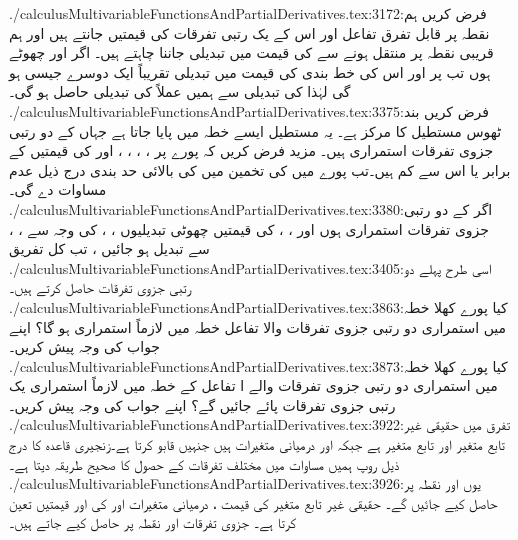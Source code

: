 ./calculusMultivariableFunctionsAndPartialDerivatives.tex:3172:فرض  کریں ہم   نقطہ    پر قابل تفرق تفاعل   اور اس کے یک رتبی تفرقات  کی قیمتیں جانتے ہیں اور ہم قریبی نقطہ   پر   منتقل ہونے سے  کی قیمت میں تبدیلی  جاننا چاہتے  ہیں۔ اگر  اور  چھوٹے ہوں تب پر   اور اس کی خط بندی کی  قیمت  میں تبدیلی تقریباً ایک دوسرے جیسی ہو گی لہٰذا  کی تبدیلی سے ہمیں عملاً   کی تبدیلی حاصل ہو گی۔
./calculusMultivariableFunctionsAndPartialDerivatives.tex:3375:فرض کریں بند  ٹھوس مستطیل   کا مرکز  ہے۔ یہ مستطیل ایسے خطہ میں پایا جاتا ہے جہاں  کے دو رتبی جزوی تفرقات استمراری ہیں۔ مزید فرض کریں کہ پورے  پر ،  ،  ،  ،   اور   کی قیمتیں  کے برابر یا اس سے کم ہیں۔تب پورے  میں    کی تخمین  میں  کی بالائی حد بندی   درج ذیل عدم مساوات دے گی۔
./calculusMultivariableFunctionsAndPartialDerivatives.tex:3380:اگر  کے  دو رتبی جزوی تفرقات استمراری ہوں اور ، ،  کی قیمتیں  چھوٹی تبدیلیوں ، ،  کی وجہ سے  ، ،  سے تبدیل ہو جائیں ، تب کل  تفریق
./calculusMultivariableFunctionsAndPartialDerivatives.tex:3405:اسی طرح پہلے دو رتبی جزوی تفرقات حاصل کرتے ہیں۔
./calculusMultivariableFunctionsAndPartialDerivatives.tex:3863:کیا پورے  کھلا خطہ  میں استمراری دو رتبی جزوی تفرقات والا   تفاعل  خطہ  میں لازماً استمراری ہو گا؟ اپنے جواب کی وجہ پیش کریں۔
./calculusMultivariableFunctionsAndPartialDerivatives.tex:3873:کیا پورے کھلا خطہ  میں استمراری دو رتبی جزوی تفرقات والے ا   تفاعل کے  خطہ  میں لازماً استمراری یک رتبی جزوی تفرقات پائے جائیں گے؟ اپنے جواب کی وجہ پیش کریں۔
./calculusMultivariableFunctionsAndPartialDerivatives.tex:3922:تفرق  میں حقیقی غیر تابع متغیر  اور تابع متغیر  ہے جبکہ  اور   درمیانی متغیرات ہیں جنہیں  قابو کرتا ہے۔زنجیری قاعدہ کا  درج ذیل روپ ہمیں  مساوات  میں مختلف تفرقات کے حصول کا صحیح طریقہ دیتا ہے۔
./calculusMultivariableFunctionsAndPartialDerivatives.tex:3926:یوں  اور  نقطہ  پر حاصل کیے جائیں گے۔ حقیقی غیر تابع متغیر کی قیمت  ،  درمیانی متغیرات  اور  کی    اور  قیمتیں  تعین کرتا ہے۔ جزوی تفرقات  اور  نقطہ  پر حاصل کیے جاتے ہیں۔ 
